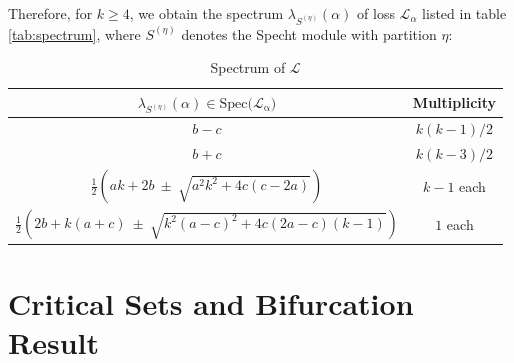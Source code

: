 \documentclass{amsart}%
\begin{document}
Therefore, for $k\ge 4$, we obtain the spectrum $\lambda_{S^{(\eta)}}(\alpha)$ of loss $\mathcal L _{\alpha}$ listed in table \eqref{tab:spectrum}, where $S^{(\eta)}$ denotes the Specht module with partition $\eta$: 
\begin{table}[h!]
\centering
\renewcommand{\arraystretch}{0.75}
\begin{tabular}{|c|c|}
\hline
$\lambda_{S^{(\eta)}}(\alpha)\in \operatorname{Spec(\mathcal L_{\alpha}})$ & Multiplicity \\
\hline\hline
$b-c$ & $k(k-1)/2$ \\
$b+c$ & $k(k-3)/2$ \\
$\displaystyle 
\frac{1}{2}\left(ak+2b\ \pm\ \sqrt{a^{2}k^{2}+4c(c-2a)}\right)$
& $k-1$ each \\
$\displaystyle
\frac{1}{2}\left(2b+k(a+c)\ \pm\ \sqrt{k^{2}(a-c)^{2}+4c(2a-c)(k-1)}\right)$
& $1$ each \\
\hline
\end{tabular}
\caption{Spectrum of $\mathcal L$}
\label{tab:spectrum}
\end{table}
\section{Critical Sets and Bifurcation Result}\label{sec:4}
\end{document}
